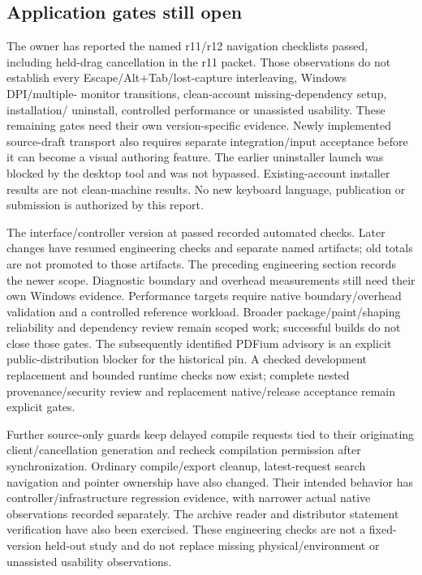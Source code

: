 \subsection{Application gates still open}
The owner has reported the named r11/r12 navigation checklists passed,
including held-drag cancellation in the r11 packet. Those observations do not
establish every Escape/Alt+Tab/lost-capture interleaving, Windows DPI/multiple-
monitor transitions, clean-account missing-dependency setup, installation/
uninstall, controlled performance or unassisted usability. These remaining
gates need their own version-specific evidence. Newly implemented source-draft
transport also requires separate integration/input acceptance before it can
become a visual authoring feature.
The earlier uninstaller launch was blocked by the desktop tool and was not
bypassed. Existing-account installer results are not clean-machine results.
No new keyboard language, publication or submission is authorized by this report.

The interface/controller version at  passed recorded automated
checks. Later changes have resumed engineering checks and separate named artifacts;
old totals are not promoted to those artifacts. The preceding engineering
section records the newer scope. Diagnostic boundary and overhead measurements
still need their own Windows evidence.
Performance targets require native boundary/overhead validation and a controlled
reference workload. Broader package/paint/shaping reliability and dependency
review remain scoped work; successful builds do not close those gates.
The subsequently identified PDFium advisory is an explicit public-distribution
blocker for the historical pin. A checked development replacement and bounded
runtime checks now exist; complete nested provenance/security review and
replacement native/release acceptance remain explicit gates.

Further source-only guards keep delayed compile requests tied to their
originating client/cancellation generation and recheck compilation permission
after synchronization. Ordinary compile/export cleanup, latest-request search
navigation and pointer ownership have also changed. Their intended behavior
has controller/infrastructure regression evidence, with narrower actual native
observations recorded separately. The archive reader and distributor statement
verification have also been exercised. These engineering checks are not a
fixed-version held-out study and do not replace missing physical/environment
or unassisted usability observations.

